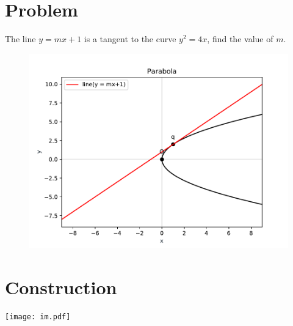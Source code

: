 \documentclass[10pt, a4paper]{article}
\title{\mytitle}
\author{\myauthor\hspace{1em}\\\contact\\FWC22040\hspace{6.5em}IITH\hspace{0.5em}\mymodule\hspace{6em}ASSIGN-6}
\date{}
\begin{document}
 \maketitle
 \tableofcontents
 \section{Problem}
 \fi
 The line $y=mx+1$ is a tangent to the curve $y^2 = 4x$, find the value of $m$. 
 \\
 \solution 
	\begin{figure}[!h]
		\centering
 \includegraphics[width=\columnwidth]{chapters/12/6/6/21/figs/im.pdf}
		\caption{}
		\label{fig:12/6/6/21}
  	\end{figure}
	\iffalse

\section{Construction}
\texttt{[image: im.pdf]}
\end{document}
